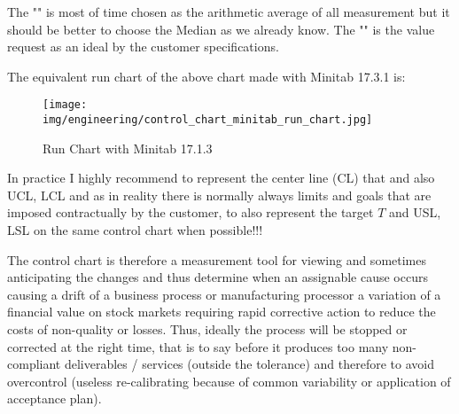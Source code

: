 	The "" is most of time chosen as the arithmetic average of all measurement but it should be better to choose the Median as we already know. The "" is the value request as an ideal by the customer specifications.
	
	The equivalent run chart\label{run chart} of the above chart made with Minitab 17.3.1 is:
	\begin{figure}[H]
		\centering
		\texttt{[image: img/engineering/control\_chart\_minitab\_run\_chart.jpg]}
		\caption{Run Chart with Minitab 17.1.3}
	\end{figure}
	
	In practice I highly recommend to represent  the center line (CL) that  and also UCL, LCL and as in reality there is normally always limits and goals that are imposed contractually by the customer, to also represent the target $T$ and  USL, LSL on the same control chart when possible!!!
	
	The control chart is therefore a measurement tool for viewing and sometimes anticipating the changes and thus determine when an assignable cause occurs causing a drift of a business process or manufacturing processor a variation of a financial value on stock markets requiring rapid corrective action to reduce the costs of non-quality or losses. Thus, ideally the process will be stopped or corrected at the right time, that is to say before it produces too many non-compliant deliverables / services (outside the tolerance) and therefore to avoid overcontrol (useless re-calibrating because of common variability or application of acceptance plan).

